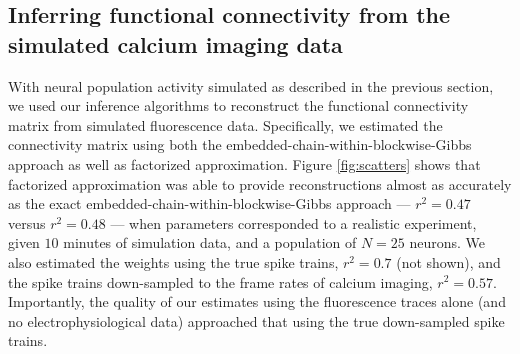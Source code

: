 \subsection{Inferring functional connectivity from the simulated calcium imaging data} \label{sec:results:inference}

With neural population activity simulated as described in the previous section, we used our inference algorithms to reconstruct the functional connectivity matrix from simulated fluorescence data. Specifically, we estimated the connectivity matrix using both the embedded-chain-within-blockwise-Gibbs approach as well as factorized approximation. Figure \ref{fig:scatters} shows that factorized approximation was able to provide reconstructions almost as accurately as the exact embedded-chain-within-blockwise-Gibbs approach --- $r^2=0.47$ versus $r^2=0.48$ --- when parameters corresponded to a realistic experiment, given $10$ minutes of simulation data, and a population of $N=25$ neurons. We also estimated the weights using the true spike trains, $r^2=0.7$ (not shown), and the spike trains down-sampled to the frame rates of calcium imaging, $r^2=0.57$. Importantly, the quality of our estimates using the fluorescence traces alone (and no electrophysiological data) approached that using the true down-sampled spike trains.  

